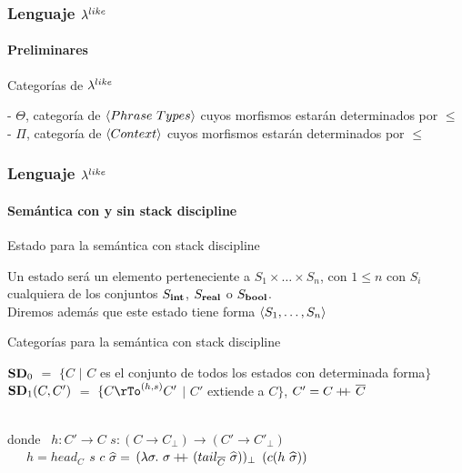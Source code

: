 \documentclass{beamer}
\begin{document}
\begin{frame}
\frametitle{Lenguaje $\lambda^{like}$}
\framesubtitle{Preliminares}

\begin{block}{Categorías de $\lambda^{like}$}

- $\Theta$, categoría de $\lrangles{Phrase \ Types}$ 
cuyos morfismos estarán determinados por $\leq$\\
- $\Pi$, categoría de $\langle Context \rangle$ cuyos morfismos estarán determinados por $\leq$

\end{block}


\end{frame}

\begin{frame}
\frametitle{Lenguaje $\lambda^{like}$}
\framesubtitle{Semántica con y sin stack discipline}

\begin{block}{Estado para la semántica con stack discipline}

Un estado será un elemento perteneciente a $S_1 \times \ldots \times S_n$, 
con $1 \leq n$ con $S_i$ cualquiera de los conjuntos $S_{\textbf{int}}$, $S_{\textbf{real}}$ o $S_{\textbf{bool}}$.\\
Diremos además que este estado tiene forma $\langle S_1,\ldots,S_n \rangle$

\end{block}

\pause

\begin{block}{Categorías para la semántica con stack discipline}

$\textbf{SD}_0$ $=$ $\{C$ $|$ $C$ es el conjunto de todos los estados con determinada forma$\}$\\
$\textbf{SD}_1(C,C')$ $=$ $\{C \rTo^{(h,s)} C'$ $|$ $C'$ extiende a $C\}$, $C' = C +\kern-1.3ex+\kern0.8ex \overline{C}$\\

\

donde \ $h: C' \rightarrow C$
\quad \quad \quad
	  $s: (C \rightarrow C_{\bot}) \rightarrow (C' \rightarrow C'_{\bot})$\\
\quad \quad \ \ \ 
	  $h = head_C$
\quad \quad \quad 
	  $s \ c \ \widehat{\sigma} =$ 
	  	   $(\lambda \sigma. \ \sigma +\kern-1.3ex+\kern0.8ex (tail_{\overline{C}} \ \widehat{\sigma}))_{\bot}$
	  	   	$(c(h \ \widehat{\sigma}))$\\
\end{block}

\end{frame}
\end{document}
